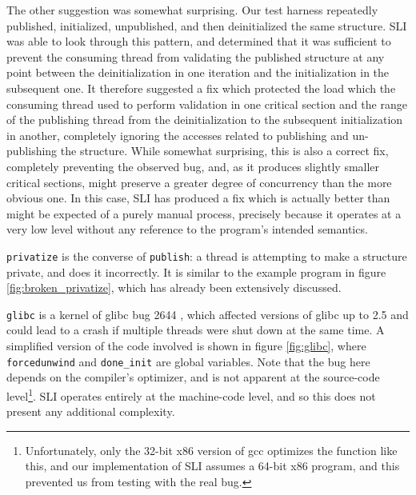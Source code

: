 \documentclass[10pt,twocolumn,preprint,natbib,authoryear]{sigplanconf}
\begin{document}
The other suggestion was somewhat surprising.  Our test harness
repeatedly published, initialized, unpublished, and then deinitialized
the same structure.  SLI was able to look through this pattern, and
determined that it was sufficient to prevent the consuming thread from
validating the published structure at any point between the
deinitialization in one iteration and the initialization in the
subsequent one.  It therefore suggested a fix which protected the load
which the consuming thread used to perform validation in one critical
section and the range of the publishing thread from the
deinitialization to the subsequent initialization in another,
completely ignoring the accesses related to publishing and
un-publishing the structure.  While somewhat surprising, this is also
a correct fix, completely preventing the observed bug, and, as it
produces slightly smaller critical sections, might preserve a greater
degree of concurrency than the more obvious one.  In this case, SLI
has produced a fix which is actually better than might be expected of
a purely manual process, precisely because it operates at a very low
level without any reference to the program's intended semantics.

\verb|privatize| is the converse of \verb|publish|: a thread is
attempting to make a structure private, and does it incorrectly.  It
is similar to the example program in figure
\ref{fig:broken_privatize}, which has already been extensively
discussed.

\verb|glibc| is a kernel of glibc bug 2644 \cite{glibc2644}, which
affected versions of glibc up to 2.5 and could lead to a crash if
multiple threads were shut down at the same time.  A simplified
version of the code involved is shown in figure \ref{fig:glibc}, where
\verb|forcedunwind| and \verb|done_init| are global variables.  Note
that the bug here depends on the compiler's optimizer, and is not
apparent at the source-code level\footnote{Unfortunately, only the
  32-bit x86 version of gcc optimizes the function like this, and our
  implementation of SLI assumes a 64-bit x86 program, and this
  prevented us from testing with the real bug.}.  SLI operates
entirely at the machine-code level, and so this does not present any
additional complexity.
\end{document}
